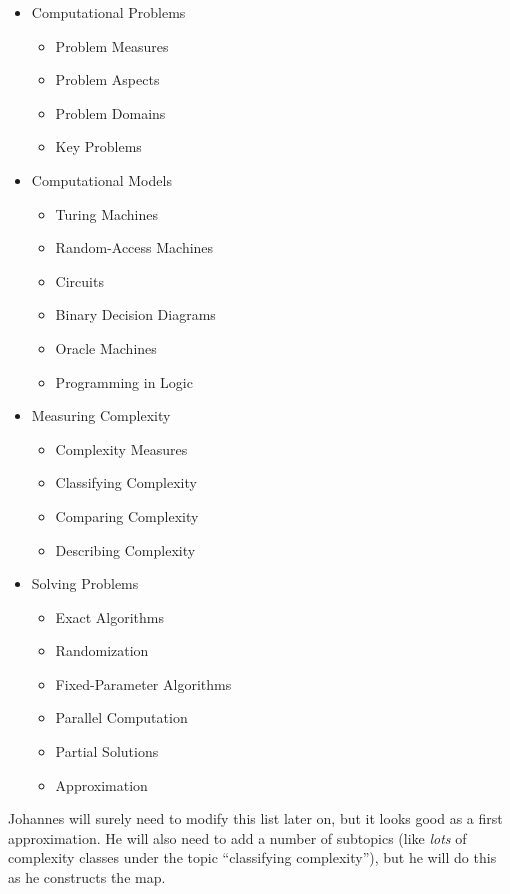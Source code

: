 \begin{itemize}
\item Computational Problems
  \begin{itemize}\itemsep=0pt\parskip=0pt
  \item Problem Measures
  \item Problem Aspects
  \item Problem Domains
  \item Key Problems
  \end{itemize}
\item Computational Models
  \begin{itemize}\itemsep=0pt\parskip=0pt
  \item Turing Machines
  \item Random-Access Machines
  \item Circuits
  \item Binary Decision Diagrams
  \item Oracle Machines
  \item Programming in Logic
  \end{itemize}
\item Measuring Complexity
  \begin{itemize}\itemsep=0pt\parskip=0pt
  \item Complexity Measures
  \item Classifying Complexity
  \item Comparing Complexity
  \item Describing Complexity
  \end{itemize}
\item Solving Problems
  \begin{itemize}\itemsep=0pt\parskip=0pt
  \item Exact Algorithms
  \item Randomization
  \item Fixed-Parameter Algorithms
  \item Parallel Computation
  \item Partial Solutions
  \item Approximation
  \end{itemize}
\end{itemize}

Johannes will surely need to modify this list later on, but it looks
good as a first approximation. He will also need to add a number of
subtopics (like \emph{lots} of complexity classes under the topic
``classifying complexity''), but he will do this as he constructs the
map. 


